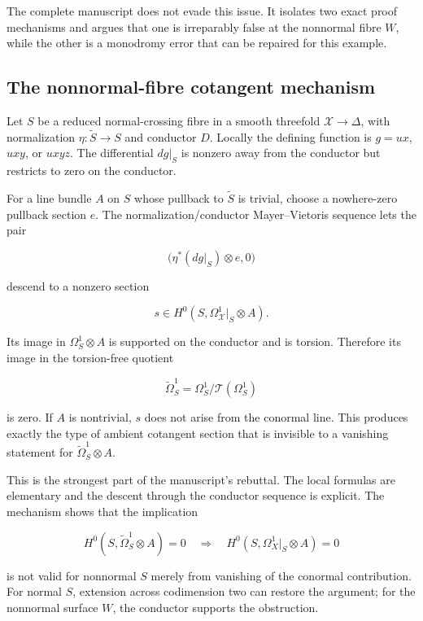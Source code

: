 \documentclass[
  10pt,
  letterpaper,
]{article}
\begin{document}
The complete manuscript does not evade this issue. It isolates two exact
proof mechanisms and argues that one is irreparably false at the
nonnormal fibre \(W\), while the other is a monodromy error that can be
repaired for this example.

\subsection{The nonnormal-fibre cotangent
mechanism}\label{the-nonnormal-fibre-cotangent-mechanism}

Let \(S\) be a reduced normal-crossing fibre in a smooth threefold
\(\mathcal X\to\Delta\), with normalization \(\eta:\widetilde S\to S\)
and conductor \(D\). Locally the defining function is \(g=ux\), \(uxy\),
or \(uxyz\). The differential \(dg|_S\) is nonzero away from the
conductor but restricts to zero on the conductor.

For a line bundle \(A\) on \(S\) whose pullback to \(\widetilde S\) is
trivial, choose a nowhere-zero pullback section \(e\). The
normalization/conductor Mayer--Vietoris sequence lets the pair

\[
\bigl(\eta^*(dg|_S)\otimes e,0\bigr)
\]

descend to a nonzero section

\[
s\in H^0(S,\Omega^1_{\mathcal X}|_S\otimes A).
\]

Its image in \(\Omega_S^1\otimes A\) is supported on the conductor and
is torsion. Therefore its image in the torsion-free quotient

\[
\widetilde\Omega_S^1=\Omega_S^1/\mathcal T(\Omega_S^1)
\]

is zero. If \(A\) is nontrivial, \(s\) does not arise from the conormal
line. This produces exactly the type of ambient cotangent section that
is invisible to a vanishing statement for
\(\widetilde\Omega_S^1\otimes A\).

This is the strongest part of the manuscript's rebuttal. The local
formulas are elementary and the descent through the conductor sequence
is explicit. The mechanism shows that the implication

\[
H^0(S,\widetilde\Omega_S^1\otimes A)=0
\quad\Longrightarrow\quad
H^0(S,\Omega^1_X|_S\otimes A)=0
\]

is not valid for nonnormal \(S\) merely from vanishing of the conormal
contribution. For normal \(S\), extension across codimension two can
restore the argument; for the nonnormal surface \(W\), the conductor
supports the obstruction.
\end{document}
